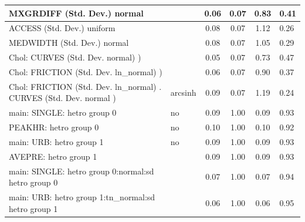 \begin{table}
\begin{center}
\begin{tabular}{|l|l|c|c|c|l|}
			\hline
			MXGRDIFF (Std. Dev.) normal &  & 0.06 & 0.07 & 0.83 & 0.41 \\
			\hline
			ACCESS (Std. Dev.) uniform &  & 0.08 & 0.07 & 1.12 & 0.26 \\
			\hline
			MEDWIDTH (Std. Dev.) normal &  & 0.08 & 0.07 & 1.05 & 0.29 \\
			\hline
			 Chol: CURVES (Std. Dev. normal) ) &  & 0.05 & 0.07 & 0.73 & 0.47 \\
			\hline
			 Chol: FRICTION (Std. Dev. ln_normal) ) &  & 0.06 & 0.07 & 0.90 & 0.37 \\
			\hline
			 Chol: FRICTION (Std. Dev. ln_normal) . CURVES (Std. Dev.   normal ) & arcsinh & 0.09 & 0.07 & 1.19 & 0.24 \\
			\hline
			main: SINGLE: hetro group 0 & no & 0.09 & 1.00 & 0.09 & 0.93 \\
			\hline
			PEAKHR: hetro group 0 & no & 0.10 & 1.00 & 0.10 & 0.92 \\
			\hline
			main: URB: hetro group 1 & no & 0.09 & 1.00 & 0.09 & 0.93 \\
			\hline
			AVEPRE: hetro group 1 &  & 0.09 & 1.00 & 0.09 & 0.93 \\
			\hline
			main: SINGLE: hetro group 0:normal:sd  hetro group 0 &  & 0.07 & 1.00 & 0.07 & 0.94 \\
			\hline
			main: URB: hetro group 1:tn_normal:sd  hetro group 1 &  & 0.06 & 1.00 & 0.06 & 0.95 \\
			\hline
		\end{tabular}
	\end{center}
\end{table}